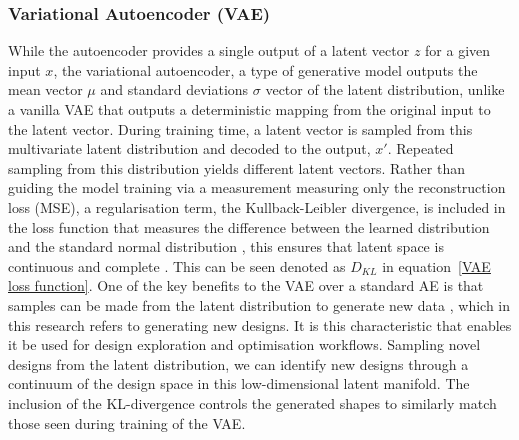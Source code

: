 \documentclass{article}
\begin{document}
\subsubsection{Variational Autoencoder (VAE)}
While the autoencoder provides a single output of a latent vector \textbf{$z$} for a given input $x$, the variational autoencoder, a type of generative model outputs the mean vector $\mu$ and standard deviations $\sigma$ vector of the latent distribution, unlike a vanilla VAE that outputs a deterministic mapping from the original input to the latent vector. During training time, a latent vector is sampled from this multivariate latent distribution and decoded to the output, $x'$. Repeated sampling from this distribution yields different latent vectors. Rather than guiding the model training via a measurement measuring only the reconstruction loss (MSE), a regularisation term, the Kullback-Leibler divergence, is included in the loss function that measures the difference between the learned distribution and the standard normal distribution \citep{Huang2022}, this ensures that latent space is continuous and complete \citep{Lew2021}. This can be seen denoted as $D_{KL}$ in equation~\eqref{VAE loss function}. One of the key benefits to the VAE over a standard AE is that samples can be made from the latent distribution to generate new data \citep{Danhaive2022}, which in this research refers to generating new designs. It is this characteristic that enables it be used for design exploration and optimisation workflows. Sampling novel designs from the latent distribution, we can identify new designs through a continuum of the design space in this low-dimensional latent manifold. The inclusion of the KL-divergence controls the generated shapes to similarly match those seen during training of the VAE.
\end{document}
